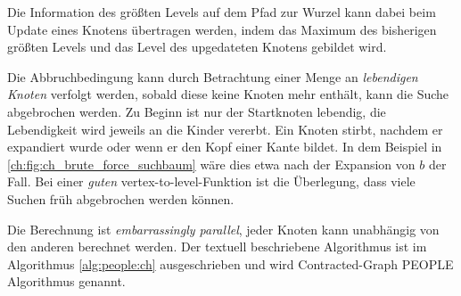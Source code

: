 Die Information des größten Levels auf dem Pfad zur Wurzel kann dabei beim Update eines Knotens übertragen werden, indem das Maximum des bisherigen größten Levels und das Level des upgedateten Knotens gebildet wird.


Die Abbruchbedingung kann durch Betrachtung einer Menge an \emph{lebendigen Knoten} verfolgt werden, sobald diese keine Knoten mehr enthält, kann die Suche abgebrochen werden.
Zu Beginn ist nur der Startknoten lebendig, die Lebendigkeit wird jeweils an die Kinder vererbt.
Ein Knoten stirbt, nachdem er expandiert wurde oder wenn er den Kopf einer Kante bildet.
In dem Beispiel in \autoref{ch:fig:ch_brute_force_suchbaum} wäre dies etwa nach der Expansion von $b$ der Fall.
Bei einer \emph{guten} vertex-to-level-Funktion ist die Überlegung, dass viele Suchen früh abgebrochen werden können.

Die Berechnung ist \emph{embarrassingly parallel}, jeder Knoten kann unabhängig von den anderen berechnet werden.
Der textuell beschriebene Algorithmus ist im Algorithmus \ref{alg:people:ch} ausgeschrieben und wird Contracted-Graph PEOPLE Algorithmus genannt.

